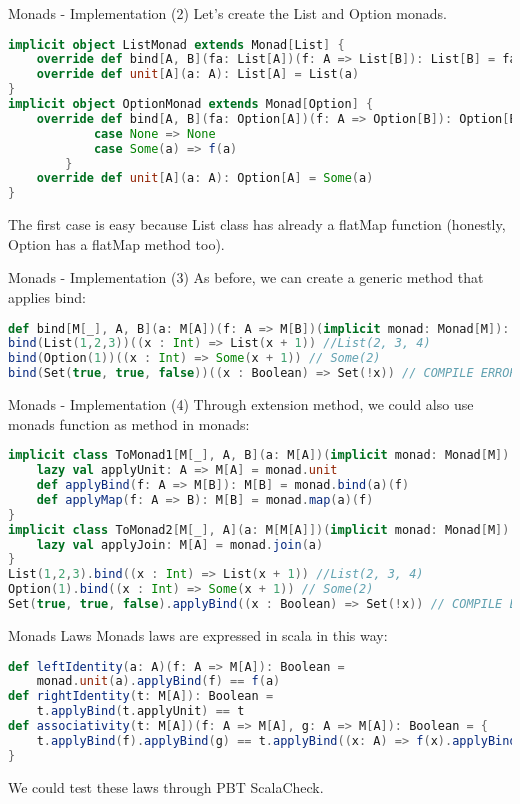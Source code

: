 \begin{frame}[fragile]{Monads - Implementation (2)}	
	Let's create the List and Option monads.
\begin{lstlisting}[language=scala]
implicit object ListMonad extends Monad[List] {
	override def bind[A, B](fa: List[A])(f: A => List[B]): List[B] = fa.flatMap(f)
	override def unit[A](a: A): List[A] = List(a)
}
implicit object OptionMonad extends Monad[Option] {
	override def bind[A, B](fa: Option[A])(f: A => Option[B]): Option[B] = fa match {
			case None => None
			case Some(a) => f(a)
		}
	override def unit[A](a: A): Option[A] = Some(a)
}		
\end{lstlisting}		
	The first case is easy because List class has already a flatMap function
	(honestly, Option has a flatMap method too).
\end{frame}

\begin{frame}[fragile]{Monads - Implementation (3)}		
	As before, we can create a generic method that applies bind:
\begin{lstlisting}[language=scala]
def bind[M[_], A, B](a: M[A])(f: A => M[B])(implicit monad: Monad[M]): M[B] = monad.bind(a)(f)
bind(List(1,2,3))((x : Int) => List(x + 1)) //List(2, 3, 4)
bind(Option(1))((x : Int) => Some(x + 1)) // Some(2)
bind(Set(true, true, false))((x : Boolean) => Set(!x)) // COMPILE ERROR
\end{lstlisting}	
\end{frame}

\begin{frame}[fragile]{Monads - Implementation (4)}	
	Through extension method, we could also use monads function as method in monads:
\begin{lstlisting}[language=scala]
implicit class ToMonad1[M[_], A, B](a: M[A])(implicit monad: Monad[M]) {
	lazy val applyUnit: A => M[A] = monad.unit	
	def applyBind(f: A => M[B]): M[B] = monad.bind(a)(f)	
	def applyMap(f: A => B): M[B] = monad.map(a)(f)
}
implicit class ToMonad2[M[_], A](a: M[M[A]])(implicit monad: Monad[M]) {
	lazy val applyJoin: M[A] = monad.join(a)
}
List(1,2,3).bind((x : Int) => List(x + 1)) //List(2, 3, 4)
Option(1).bind((x : Int) => Some(x + 1)) // Some(2)
Set(true, true, false).applyBind((x : Boolean) => Set(!x)) // COMPILE ERROR	
\end{lstlisting}	
\end{frame}

\begin{frame}[fragile]{Monads Laws}
	Monads laws are expressed in scala in this way:
\begin{lstlisting}[language=scala]
def leftIdentity(a: A)(f: A => M[A]): Boolean = 
	monad.unit(a).applyBind(f) == f(a)
def rightIdentity(t: M[A]): Boolean = 
	t.applyBind(t.applyUnit) == t
def associativity(t: M[A])(f: A => M[A], g: A => M[A]): Boolean = {
	t.applyBind(f).applyBind(g) == t.applyBind((x: A) => f(x).applyBind(g))
}
\end{lstlisting}	
	We could test these laws through PBT ScalaCheck.
\end{frame}

